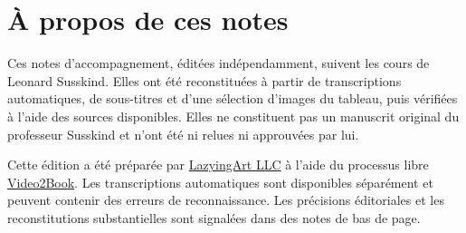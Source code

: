 \documentclass[11pt,oneside]{book}
\begin{document}
\frontmatter
\hypersetup{pageanchor=false}

\hypersetup{pageanchor=true}

\clearpage
\chapter*{À propos de ces notes}
Ces notes d’accompagnement, éditées indépendamment, suivent les cours de Leonard Susskind. Elles ont été reconstituées à partir de transcriptions automatiques, de sous-titres et d’une sélection d’images du tableau, puis vérifiées à l’aide des sources disponibles. Elles ne constituent pas un manuscrit original du professeur Susskind et n’ont été ni relues ni approuvées par lui.

Cette édition a été préparée par \href{https://lazying.art}{LazyingArt LLC} à l’aide du processus libre \href{https://github.com/lachlanchen/Video2Book}{Video2Book}. Les transcriptions automatiques sont disponibles séparément et peuvent contenir des erreurs de reconnaissance. Les précisions éditoriales et les reconstitutions substantielles sont signalées dans des notes de bas de page.
\clearpage
\tableofcontents
\mainmatter










\end{document}
